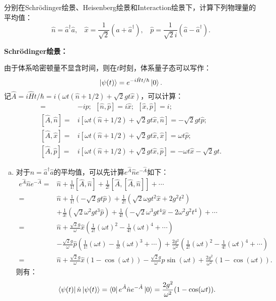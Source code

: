 \documentclass[reqno,a4paper,12pt]{amsart}
\begin{document}
分别在Schr\"{o}dinger绘景、Heisenberg绘景和Interaction绘景下，计算下列物理量的平均值：
\[
	\hat{n} = \hat{a}^\dagger\hat{a}, \ \ \ \ \hat{x} = \frac{1}{\sqrt{2}} (\hat{a}+\hat{a}^\dagger), \ \ \ \ \hat{p} = \frac{1}{\sqrt{2}i}(\hat{a}-\hat{a}^\dagger).
\]
\begin{tcolorbox}[breakable, colback = black!5!white, colframe = black]
\textbf{Schr\"{o}dinger绘景：}

由于体系哈密顿量不显含时间，则在$t$时刻，体系量子态可以写作：
\[
	\ket{\psi(t)} = e^{-i\hat{H}t/\hbar} \ket{0}.
\]
记$\hat{A} = i\hat{H}t/\hbar = i(\omega t(\hat{n} + 1/2) + \sqrt{2}gt \hat{x})$，可以计算：
\begin{align*}
	[\hat{n},\hat{x}] =& -i\hat{p}; \ \ [\hat{n},\hat{p}] = i\hat{x}; \ \ [\hat{x},\hat{p}] = i; \\
	[\hat{A}, \hat{n}] =& i[\omega t(\hat{n}+1/2)+\sqrt{2}gt \hat{x}, \hat{n}] = -\sqrt{2} gt \hat{p}; \\
	[\hat{A}, \hat{x}] =& i[\omega t(\hat{n}+1/2)+\sqrt{2}gt \hat{x}, \hat{x}] = \omega t \hat{p}; \\
	[\hat{A}, \hat{p}] =& i[\omega t(\hat{n}+1/2)+\sqrt{2}gt \hat{x}, \hat{p}] = -\omega t \hat{x} - \sqrt{2} gt.
\end{align*}

\begin{enumerate}[(a)]
\item 对于$\hat{n} = \hat{a}^\dagger\hat{a}$的平均值，可以先计算$e^{\hat{A}} \hat{n} e^{-\hat{A}}$如下：
\begin{align*}
	e^{\hat{A}} \hat{n} e^{-\hat{A}} =& \hat{n} + \frac{1}{1!} [\hat{A},\hat{n}] + \frac{1}{2!} [\hat{A}, [\hat{A},\hat{n}]] + \cdots \\
	=& \hat{n} + \frac{1}{1!} (-\sqrt{2}gt\hat{p}) + \frac{1}{2!} (\sqrt{2}\omega g t^2 \hat{x} + 2g^2t^2) \\
	&+ \frac{1}{3!}(\sqrt{2}\omega^2 g t^3 \hat{p}) + \frac{1}{4!}(-\sqrt{2}\omega^3gt^4 \hat{x} - 2\omega^2g^2t^4) + \cdots \\
	=& \hat{n} + \frac{\sqrt{2}g}{\omega}\hat{x} \left( \frac{1}{2!}(\omega t)^2 - \frac{1}{4!}(\omega t)^4 + \cdots \right) \\
	&- \frac{\sqrt{2}g}{\omega}\hat{p} \left( \frac{1}{1!}(\omega t) - \frac{1}{3!}(\omega t)^3 + \cdots \right) + \frac{2g^2}{\omega^2} \left( \frac{1}{2!}(\omega t)^2 - \frac{1}{4!}(\omega t)^4 + \cdots \right) \\
	=& \hat{n} + \frac{\sqrt{2}g}{\omega}\hat{x}(1-\cos(\omega t)) - \frac{\sqrt{2}g}{\omega}\hat{p}\sin(\omega t) + \frac{2g^2}{\omega^2}(1-\cos(\omega t)).
\end{align*}
则有：
\[
	\bra{\psi(t)} \hat{n} \ket{\psi(t)} = \bra{0} e^{\hat{A}} \hat{n} e^{-\hat{A}} \ket{0} = \frac{2g^2}{\omega^2}(1-\cos(\omega t)).
\]


\end{enumerate}
\end{tcolorbox}
\end{document}
